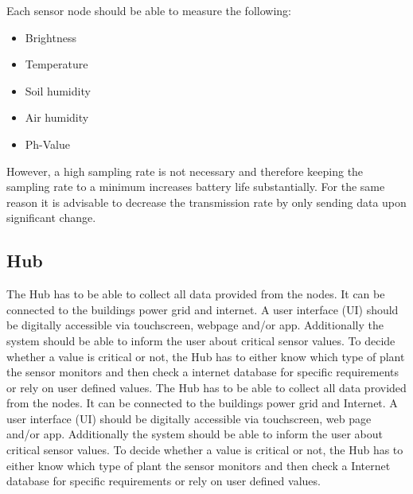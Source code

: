 \documentclass[conference]{IEEEtran}
\begin{document}
Each sensor node should be able to measure the following:
\begin{itemize}
	\item Brightness
	\item Temperature
	\item Soil humidity
	\item Air humidity
	\item Ph-Value
\end{itemize}
However, a high sampling rate is not necessary and therefore keeping the sampling rate to a minimum increases battery life substantially. For the same reason it is advisable to decrease the transmission rate by only sending data upon significant change.

\subsection{Hub}
The Hub has to be able to collect all data provided from the nodes. It can be connected to the buildings power grid and internet. A user interface (UI) should be digitally accessible via touchscreen, webpage and/or app. Additionally the system should be able to inform the user about critical sensor values. To decide whether a value is critical or not, the Hub has to either know which type of plant the sensor monitors and then check a internet database for specific requirements or rely on user defined values.
The Hub has to be able to collect all data provided from the nodes. It can be connected to the buildings power grid and Internet. A user interface (UI) should be digitally accessible via touchscreen, web page and/or app. Additionally the system should be able to inform the user about critical sensor values. To decide whether a value is critical or not, the Hub has to either know which type of plant the sensor monitors and then check a Internet database for specific requirements or rely on user defined values.



\end{document}

